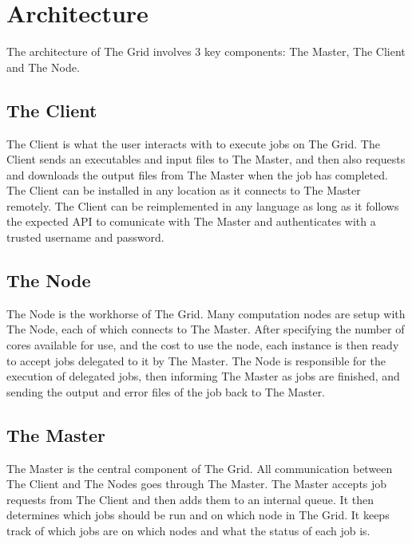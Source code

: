 \chapter{Architecture}
The architecture of The Grid involves 3 key components: The Master, The Client and The Node.

\section{The Client}
The Client is what the user interacts with to execute jobs on The Grid. The Client sends an executables and input files to The Master, and then also requests and downloads the output files from The Master when the job has completed. The Client can be installed in any location as it connects to The Master remotely. The Client can be reimplemented in any language as long as it follows the expected API to comunicate with The Master and authenticates with a trusted username and password.

\section{The Node}
The Node is the workhorse of The Grid. Many computation nodes are setup with The Node, each of which connects to The Master. After specifying the number of cores available for use, and the cost to use the node, each instance is then ready to accept jobs delegated to it by The Master. The Node is responsible for the execution of delegated jobs, then informing The Master as jobs are finished, and sending the output and error files of the job back to The Master.

\section{The Master}
The Master is the central component of The Grid. All communication between The Client and The Nodes goes through The Master. The Master accepts job requests from The Client and then adds them to an internal queue. It then determines which jobs should be run and on which node in The Grid. It keeps track of which jobs are on which nodes and what the status of each job is. 
